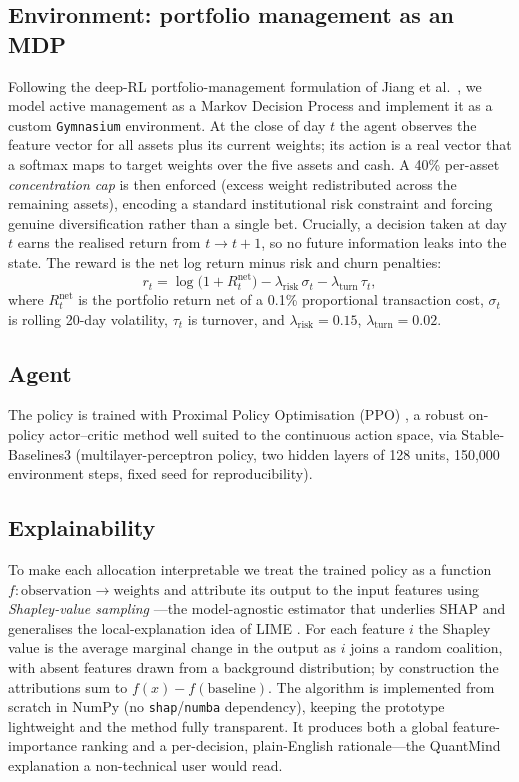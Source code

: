 \subsection{Environment: portfolio management as an MDP}
Following the deep-RL portfolio-management formulation of Jiang et
al.~\cite{jiang2017}, we model active management as a Markov Decision Process and
implement it as a custom \texttt{Gymnasium} environment. At the close of day $t$
the agent observes the feature vector for all assets plus its current weights;
its action is a real vector that a softmax maps to target weights over the five
assets and cash. A 40\% per-asset \emph{concentration cap} is then enforced
(excess weight redistributed across the remaining assets), encoding a standard
institutional risk constraint and forcing genuine diversification rather than a
single bet. Crucially, a decision taken at day $t$ earns the realised return from
$t\!\to\!t\!+\!1$, so no future information leaks into the state. The reward is
the net log return minus risk and churn penalties:
\begin{equation}
r_t = \log\!\big(1 + R_t^{\text{net}}\big) - \lambda_{\text{risk}}\,\sigma_t
      - \lambda_{\text{turn}}\,\tau_t,
\label{eq:reward}
\end{equation}
where $R_t^{\text{net}}$ is the portfolio return net of a 0.1\% proportional
transaction cost, $\sigma_t$ is rolling 20-day volatility, $\tau_t$ is turnover,
and $\lambda_{\text{risk}}=0.15$, $\lambda_{\text{turn}}=0.02$.

\subsection{Agent}
The policy is trained with Proximal Policy Optimisation (PPO)
\cite{schulman2017}, a robust on-policy actor--critic method well suited to the
continuous action space, via Stable-Baselines3 \cite{sb3} (multilayer-perceptron
policy, two hidden layers of 128 units, 150{,}000 environment steps, fixed seed
for reproducibility).

\subsection{Explainability}
\label{sec:proto-xai}
To make each allocation interpretable we treat the trained policy as a function
$f:\text{observation}\!\to\!\text{weights}$ and attribute its output to the input
features using \emph{Shapley-value sampling} \cite{strumbelj2014}---the
model-agnostic estimator that underlies SHAP \cite{lundberg2017} and generalises
the local-explanation idea of LIME \cite{ribeiro2016}. For each feature $i$ the
Shapley value is the average marginal change in the output as $i$ joins a random
coalition, with absent features drawn from a background distribution; by
construction the attributions sum to $f(x)-f(\text{baseline})$. The algorithm is
implemented from scratch in NumPy (no \texttt{shap}/\texttt{numba} dependency),
keeping the prototype lightweight and the method fully transparent. It produces
both a global feature-importance ranking and a per-decision, plain-English
rationale---the QuantMind explanation a non-technical user would read.

